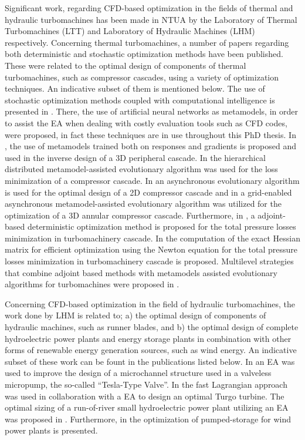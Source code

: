 Significant work, regarding CFD-based optimization in the fields of thermal and hydraulic turbomachines has been made in NTUA by the Laboratory of Thermal Turbomachines (LTT) and Laboratory of Hydraulic Machines (LHM) respectively. 
Concerning thermal turbomachines, a number of papers regarding both deterministic and stochastic optimization methods have been published. These were related to the optimal design of components of thermal turbomachines, such as compressor cascades, using a variety of optimization techniques.  An indicative subset of them is mentioned below. The use of stochastic optimization methods coupled with computational intelligence is presented in \cite{LTT_2_018,LTT_2_020,LTT_2_023}. There, the use of artificial neural networks as metamodels, in order to assist the EA when dealing with costly evaluation tools such as CFD codes, were proposed, in fact these techniques are in use throughout this PhD thesis. In \cite{LTT_2_026}, the use of metamodels trained both on responses and gradients is proposed and used in the inverse design of a 3D peripheral cascade. In \cite{LTT_2_031} the hierarchical distributed metamodel-assisted evolutionary algorithm was used for the loss minimization of a compressor cascade. In \cite{LTT_2_040} an asynchronous evolutionary algorithm is used for the optimal design of a 2D compressor cascade and in \cite{LTT_2_045} a grid-enabled asynchronous metamodel-assisted evolutionary algorithm was utilized for the optimization of a 3D annular compressor cascade. Furthermore, in \cite{LTT_2_032}, a adjoint-based  deterministic optimization method is proposed for the total pressure losses minimization in turbomachinery cascade.  In \cite{LTT_2_049}  the computation of the exact Hessian matrix for efficient optimization using the Newton equation for the total pressure losses minimization in turbomachinery cascade is proposed. Multilevel strategies that combine adjoint based methods with metamodels assisted evolutionary algorithms for turbomachines were proposed in \cite{LTT_3_092}.


Concerning CFD-based optimization in the field of hydraulic turbomachines, the work done by LHM is related to; a) the optimal design of components of hydraulic machines, such as runner blades, and b) the optimal design of complete hydroelectric power plants and energy storage plants in combination with other forms of renewable energy generation sources, such as wind energy. An indicative subset of these work can be fount in the publications listed below. In \cite{Anagno2} an EA was used to improve the design of a microchannel structure used in a valveless micropump, the so-called ``Tesla-Type Valve''. In \cite{Anagno4} the fast Lagrangian approach was used in collaboration with a EA to design an optimal Turgo turbine. The optimal sizing of a run-of-river small hydroelectric power plant utilizing an EA was proposed in \cite{Anagno3}. Furthermore, in \cite{Anagno5,Anagno6} the optimization of pumped-storage for wind power plants is presented.

